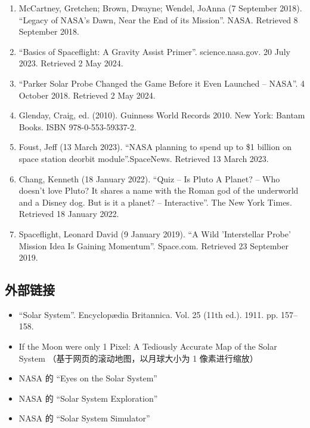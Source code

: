\begin{enumerate}
\item McCartney, Gretchen; Brown, Dwayne; Wendel, JoAnna (7 September 2018). ``Legacy of NASA's Dawn, Near the End of its Mission''. NASA. Retrieved 8 September 2018.
\item ``Basics of Spaceflight: A Gravity Assist Primer''. science.nasa.gov. 20 July 2023. Retrieved 2 May 2024.
\item ``Parker Solar Probe Changed the Game Before it Even Launched – NASA''. 4 October 2018. Retrieved 2 May 2024.
\item Glenday, Craig, ed. (2010). Guinness World Records 2010. New York: Bantam Books. ISBN 978-0-553-59337-2.
\item Foust, Jeff (13 March 2023). ``NASA planning to spend up to \$1 billion on space station deorbit module''.SpaceNews. Retrieved 13 March 2023.
\item Chang, Kenneth (18 January 2022). ``Quiz – Is Pluto A Planet? – Who doesn't love Pluto? It shares a name with the Roman god of the underworld and a Disney dog. But is it a planet? – Interactive''. The New York Times. Retrieved 18 January 2022.
\item Spaceflight, Leonard David (9 January 2019). ``A Wild 'Interstellar Probe' Mission Idea Is Gaining Momentum''. Space.com. Retrieved 23 September 2019.
\end{enumerate}
\subsection{外部链接}
\begin{itemize}
\item ``Solar System''. Encyclopædia Britannica. Vol. 25 (11th ed.). 1911. pp. 157–158.
\item If the Moon were only 1 Pixel: A Tediously Accurate Map of the Solar System （基于网页的滚动地图，以月球大小为 1 像素进行缩放）
\item NASA 的 “Eyes on the Solar System”
\item NASA 的 “Solar System Exploration”
\item NASA 的 “Solar System Simulator”
\end{itemize}

